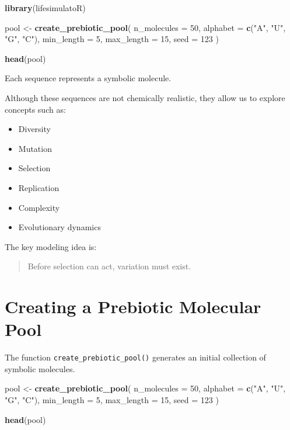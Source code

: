 \documentclass[
  oneside,
  openany]{book}
\newenvironment{Shaded}{\begin{snugshade}}{\end{snugshade}}
\newcommand{\AttributeTok}[1]{\textcolor[rgb]{0.13,0.29,0.53}{#1}}
\newcommand{\DecValTok}[1]{\textcolor[rgb]{0.00,0.00,0.81}{#1}}
\newcommand{\FunctionTok}[1]{\textcolor[rgb]{0.13,0.29,0.53}{\textbf{#1}}}
\newcommand{\NormalTok}[1]{#1}
\newcommand{\OtherTok}[1]{\textcolor[rgb]{0.56,0.35,0.01}{#1}}
\newcommand{\StringTok}[1]{\textcolor[rgb]{0.31,0.60,0.02}{#1}}
\providecommand{\tightlist}{%
  \setlength{\itemsep}{0pt}\setlength{\parskip}{0pt}}
\begin{document}
\begin{Shaded}
\begin{Highlighting}[]
\FunctionTok{library}\NormalTok{(lifesimulatoR)}

\NormalTok{pool }\OtherTok{\textless{}{-}} \FunctionTok{create\_prebiotic\_pool}\NormalTok{(}
  \AttributeTok{n\_molecules =} \DecValTok{50}\NormalTok{,}
  \AttributeTok{alphabet =} \FunctionTok{c}\NormalTok{(}\StringTok{"A"}\NormalTok{, }\StringTok{"U"}\NormalTok{, }\StringTok{"G"}\NormalTok{, }\StringTok{"C"}\NormalTok{),}
  \AttributeTok{min\_length =} \DecValTok{5}\NormalTok{,}
  \AttributeTok{max\_length =} \DecValTok{15}\NormalTok{,}
  \AttributeTok{seed =} \DecValTok{123}
\NormalTok{)}

\FunctionTok{head}\NormalTok{(pool)}
\end{Highlighting}
\end{Shaded}

Each sequence represents a symbolic molecule.

Although these sequences are not chemically realistic, they allow us to explore concepts such as:

\begin{itemize}
\tightlist
\item
  Diversity
\item
  Mutation
\item
  Selection
\item
  Replication
\item
  Complexity
\item
  Evolutionary dynamics
\end{itemize}

The key modeling idea is:

\begin{quote}
Before selection can act, variation must exist.
\end{quote}

\section{Creating a Prebiotic Molecular Pool}\label{creating-a-prebiotic-molecular-pool}

The function \texttt{create\_prebiotic\_pool()} generates an initial collection of symbolic molecules.

\begin{Shaded}
\begin{Highlighting}[]
\NormalTok{pool }\OtherTok{\textless{}{-}} \FunctionTok{create\_prebiotic\_pool}\NormalTok{(}
  \AttributeTok{n\_molecules =} \DecValTok{50}\NormalTok{,}
  \AttributeTok{alphabet =} \FunctionTok{c}\NormalTok{(}\StringTok{"A"}\NormalTok{, }\StringTok{"U"}\NormalTok{, }\StringTok{"G"}\NormalTok{, }\StringTok{"C"}\NormalTok{),}
  \AttributeTok{min\_length =} \DecValTok{5}\NormalTok{,}
  \AttributeTok{max\_length =} \DecValTok{15}\NormalTok{,}
  \AttributeTok{seed =} \DecValTok{123}
\NormalTok{)}

\FunctionTok{head}\NormalTok{(pool)}
\end{Highlighting}
\end{Shaded}
\end{document}
